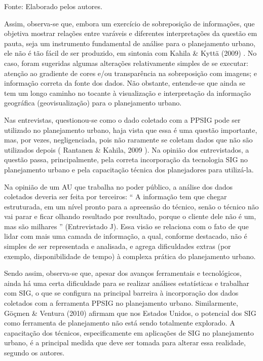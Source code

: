 \documentclass{article}
\begin{document}
Fonte: Elaborado pelos autores.

Assim, observa-se que, embora um exercício de sobreposição de informações, que
					objetiva mostrar relações entre varáveis e diferentes interpretações da questão
					em pauta, seja um instrumento fundamental de análise para o planejamento urbano,
					ele não é tão fácil de ser produzido, em sintonia com %
Kahila \& Kyttä (2009)%
. No caso, foram sugeridas
					algumas alterações relativamente simples de se executar: atenção ao gradiente de
					cores e/ou transparência na sobreposição com imagens; e informação correta da
					fonte dos dados. Não obstante, entende-se que ainda se tem um longo caminho no
					tocante à visualização e interpretação da informação geográfica
					(geovisualização) para o planejamento urbano.

Nas entrevistas, questionou-se como o dado coletado com a PPSIG pode ser
					utilizado no planejamento urbano, haja vista que essa é uma questão importante,
					mas, por vezes, negligenciada, pois não raramente se coletam dados que não são
					utilizados depois (%
Rantanen \& Kahila,
						2009%
). Na opinião dos entrevistados, a questão passa, principalmente,
					pela correta incorporação da tecnologia SIG no planejamento urbano e pela
					capacitação técnica dos planejadores para utilizá-la.

Na opinião de um AU que trabalha no poder público, a análise dos dados coletados
					deveria ser feita por terceiros: “%
A informação tem que chegar
						estruturada, em um nível pronto para a apreensão do técnico, senão o técnico
						não vai parar e ficar olhando resultado por resultado, porque o cliente dele
						não é um, mas são milhares%
” (Entrevistado J). Essa visão se
					relaciona com o fato de que lidar com mais uma camada de informação, a qual,
					conforme destacado, não é simples de ser representada e analisada, e agrega
					dificuldades extras (por exemplo, disponibilidade de tempo) à complexa prática
					do planejamento urbano.

Sendo assim, observa-se que, apesar dos avanços ferramentais e tecnológicos,
					ainda há uma certa dificuldade para se realizar análises estatísticas e
					trabalhar com SIG, o que se configura na principal barreira à incorporação dos
					dados coletados com a ferramenta PPSIG no planejamento urbano. Similarmente,
Göçmen \& Ventura (2010)%
 afirmam
					que nos Estados Unidos, o potencial dos SIG como ferramenta de planejamento não
					está sendo totalmente explorado. A capacitação dos técnicos, especificamente em
					aplicações de SIG no planejamento urbano, é a principal medida que deve ser
					tomada para alterar essa realidade, segundo os autores.
\end{document}
